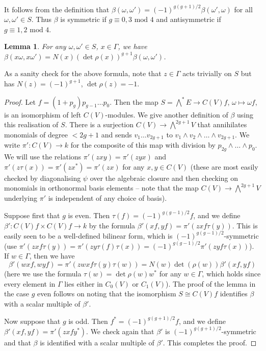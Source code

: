 \documentclass{article} %
\newtheorem{lemma}[proposition]{Lemma}
\numberwithin{equation}{section}
\begin{document}
It follows from the definition that $\beta(\omega, \omega') = (-1)^{g(g+1)/2} \beta(\omega', \omega)$ for all $\omega, \omega' \in S$. Thus $\beta$ is symmetric if $g \equiv 0, 3 \text{ mod }4$ and antisymmetric if $g \equiv 1, 2 \text{ mod }4$. 
\begin{lemma}\label{lem_covariance_of_beta}
    For any $\omega, \omega' \in S$, $x \in \Gamma$, we have $\beta(x \omega, x \omega') = N(x) ( \det \rho(x) )^{g+1} \beta(\omega, \omega')$. 
\end{lemma}
As a sanity check for the above formula, note that $z \in \Gamma$ acts trivially on $S$ but has $N(z) = (-1)^{g+1}$, $\det \rho(z) = -1$. 
\begin{proof}
    Let $f = (1 + p_g) p_{g-1} \dots p_0$. Then the map $S = \bigwedge^\ast E \to C(V) f$, $\omega \mapsto \omega f$, is an isomorphism of left $C(V)$-modules. We give another definition of $\beta$ using this realisation of $S$. There is a surjection $C(V) \to \bigwedge^{2g+1} V$ that annihilates monomials of degree $< 2g+1$ and sends $v_1 \dots v_{2g+1}$ to $v_1 \wedge v_2 \wedge \dots \wedge v_{2g+1}$. We write $\pi' : C(V) \to k$ for the composite of this map with division by $p_{2g} \wedge \dots \wedge p_0$. We will use the relations $\pi'(zxy) = \pi'(zyx)$ and $\pi'(z \tau(x)) = \pi'(z x^\ast) = \pi'( zx)$ for any $x, y \in C(V)$ (these are most easily checked by diagonalising $\psi$ over the algebraic closure and then checking on monomials in orthonormal basis elements -- note that the map $C(V) \to \bigwedge^{2g+1} V$ underlying $\pi'$ is independent of any choice of basis). 

    Suppose first that $g$ is even. Then $\tau(f) = (-1)^{g(g-1)/2} f$, and we define $\beta' : C(V) f \times C(V) f \to k$ by the formula $\beta'(xf, yf) = \pi'(z x f \tau(y))$. This is easily seen to be a well-defined bilinear form, which is $(-1)^{g(g-1)/2}$-symmetric (use $\pi'(z x f \tau(y)) = \pi'(z y \tau(f) \tau(x)) = (-1)^{g(g-1)/2} \pi'(z y f \tau(x))$). If $w \in \Gamma$, then we have
    \[ \beta'(w x f, w y f) = \pi'(z w x f \tau(y) \tau(w)) = N(w) \det(\rho(w)) \beta'(x f, y f) \]
    (here we use the formula $\tau(w) = \det \rho(w) w^\ast$ for any $w \in \Gamma$, which holds since every element in $\Gamma$ lies either in $C_0(V)$ or $C_1(V)$). The proof of the lemma in the case $g$ even follows on noting that the isomorphism $S \cong C(V) f$ identifies $\beta$ with a scalar multiple of $\beta'$. 

    Now suppose that $g$ is odd. Then $f^\ast = (-1)^{g(g+1)/2} f$, and we define $\beta'(x f, y f) = \pi'(z x f y^\ast)$. We check again that $\beta'$ is $(-1)^{g(g+1)/2}$-symmetric and that $\beta$ is identified with a scalar multiple of $\beta'$. This completes the proof.
\end{proof}
\end{document}
